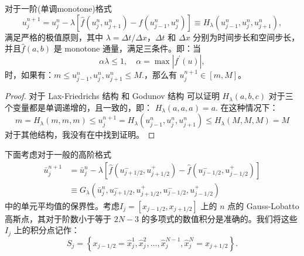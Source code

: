 \documentclass{book}
\begin{document}
\begin{theorem}
    对于一阶(单调monotone)格式
    \begin{equation}
        u_{j}^{n+1}=u_{j}^{n}-\lambda\left[\hat{f}\left(u_{j}^{n}, u_{j+1}^{n}\right)-\hat{f}\left(u_{j-1}^{n}, u_{j}^{n}\right)\right] \equiv H_{\lambda}\left(u_{j-1}^{n}, u_{j}^{n}, u_{j+1}^{n}\right),
    \end{equation}
    满足严格的极值原则，其中 $\lambda=\Delta t / \Delta x$，$\Delta t$  和  $\Delta x$ 分别为时间步长和空间步长，并且$\hat{f}(a, b)$ 是 monotone 通量，满足三条件。即：当
    \begin{equation}
        \label{eqa:pp_1D_1Order_CFL}
        \alpha \lambda \leq 1, \quad \alpha=\max \left|f^{\prime}(u)\right|,
    \end{equation}
    时，如果有：$m \leq u_{j-1}^{n}, u_{j}^{n}, u_{j+1}^{n} \leq M .$，那么有 $u_{j}^{n+1}\in[m,M]$。
\end{theorem}
\begin{proof}
    对于 Lax-Friedrichs 结构 和 Godunov 结构
    可以证明 $H_{\lambda}(a, b, c)$  对于三个变量都是单调递增的，且一致的，即： $H_{\lambda}(a, a, a)=a$. 在这种情况下：
    \begin{equation}
        m=H_{\lambda}(m, m, m) \leq u_{j}^{n+1}=H_{\lambda}\left(u_{j-1}^{n}, u_{j}^{n}, u_{j+1}^{n}\right) \leq H_{\lambda}(M, M, M)=M
    \end{equation}
    对于其他结构，我没有在\cite{PP-review}中找到证明。
\end{proof}
下面考虑对于一般的高阶格式
\begin{equation}
    \label{eqa:pp_high_order_scheme}
    \begin{aligned}
        \bar{u}_{j}^{n+1} & =\bar{u}_{j}^{n}-\lambda\left[\hat{f}\left(u_{j+1 / 2}^{-}, u_{j+1 / 2}^{+}\right)-\hat{f}\left(u_{j-1 / 2}^{-}, u_{j-1 / 2}^{+}\right)\right] \\
                          & \equiv G_{\lambda}\left(\bar{u}_{j}^{n}, u_{j+1 / 2}^{-}, u_{j+1 / 2}^{+}, u_{j-1 / 2}^{-}, u_{j-1 / 2}^{+}\right)
    \end{aligned}
\end{equation}
中的单元平均值的保界性。考虑$I_{j}=\left[x_{j-1 / 2}, x_{j+1 / 2}\right]$ 上的 $n$ 点的 Gauss-Lobatto 高斯点，其对于阶数小于等于 $2N-3$ 的多项式的数值积分是准确的。我们将这些 $I_{j}$ 上的积分点记作：
\begin{equation}
    S_{j}=\left\{x_{j-1 / 2}=\hat{x}_{j}^{1}, \hat{x}_{j}^{2}, \ldots, \hat{x}_{j}^{N-1}, \hat{x}_{j}^{N}=x_{j+1 / 2}\right\} .
\end{equation}
\end{document}
